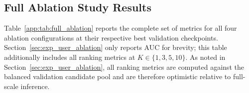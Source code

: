 \begin{appendices}
\section*{Full Ablation Study Results}
\label{app:ablation_full}

Table~\ref{app:tab:full_ablation} reports the complete set of metrics for all four ablation configurations at their respective best validation checkpoints. Section~\ref{sec:exp_user_ablation} only reports  AUC for brevity; this table additionally includes all ranking metrics at $K \in \{1, 3, 5, 10\}$. As noted in Section~\ref{sec:exp_user_ablation}, all ranking metrics are computed against the balanced validation candidate pool and are therefore optimistic relative to full-scale inference.
\begin{table}[htbp]
    \centering
    \small
    \caption{Full ablation results across all metrics at best validation checkpoint.}
    \label{app:tab:full_ablation}
\end{table}
\end{appendices}
